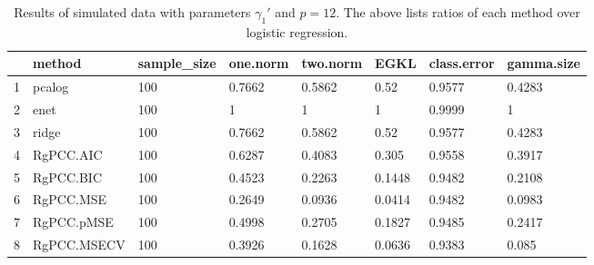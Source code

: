 \begin{table}[ht]
\centering
\begin{tabular}{rlllllll}
  \hline
 & method & sample\_size & one.norm & two.norm & EGKL & class.error & gamma.size \\ 
  \hline
1 & pcalog & 100 & 0.7662 & 0.5862 & 0.52 & 0.9577 & 0.4283 \\ 
  2 & enet & 100 & 1 & 1 & 1 & 0.9999 & 1 \\ 
  3 & ridge & 100 & 0.7662 & 0.5862 & 0.52 & 0.9577 & 0.4283 \\ 
  4 & RgPCC.AIC & 100 & 0.6287 & 0.4083 & 0.305 & 0.9558 & 0.3917 \\ 
  5 & RgPCC.BIC & 100 & 0.4523 & 0.2263 & 0.1448 & 0.9482 & 0.2108 \\ 
  6 & RgPCC.MSE & 100 & 0.2649 & 0.0936 & 0.0414 & 0.9482 & 0.0983 \\ 
  7 & RgPCC.pMSE & 100 & 0.4998 & 0.2705 & 0.1827 & 0.9485 & 0.2417 \\ 
  8 & RgPCC.MSECV & 100 & 0.3926 & 0.1628 & 0.0636 & 0.9383 & 0.085 \\ 
   \hline
\end{tabular}
\caption{Results of simulated data with parameters $\gamma_1'$ and $p =12$. The above lists ratios of each method over logistic regression.} 
\label{fig-1'-nonlead-alt-12-metrics-pratio}
\end{table}
